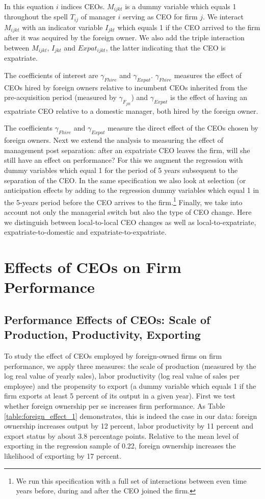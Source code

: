 \documentclass[12pt,a4paper]{article}
\begin{document}
In this equation $i$ indices CEOs. $M_{ijkt}$ is a dummy variable which equals 1 throughout the spell $T_{ij}$ of manager $i$ serving as CEO for firm $j$. We interact $M_{ijkt}$ with an indicator variable $I_{jkt}$ which equals 1 if the CEO arrived to the firm after it was acquired by the foreign owner. We also add the triple interaction between $M_{ijkt}$, $I_{jkt}$ and $Expat_{ijkt}$, the latter indicating that the CEO is expatriate. 

The coefficients of interest are $\gamma_{Fhire}$ and $\gamma_{Expat}$. $\gamma_{Fhire}$ measures the effect of CEOs hired by foreign owners relative to incumbent CEOs inherited from the pre-acquisition period (measured by $\gamma_{F_{jkt}}$) and $\gamma_{Expat}$ is the effect of having an expatriate CEO relative to a domestic manager, both hired by the foreign owner.

The coefficients $\gamma_{Fhire}$ and $\gamma_{Expat}$ measure the direct effect of the CEOs chosen by foreign owners. Next we extend the analysis to measuring the effect of management post separation: after an expatriate CEO leaves the firm, will she still have an effect on performance? For this we augment the regression with dummy variables which equal 1 for the period of 5 years subsequent to the separation of the CEO. In the same specification we also look at selection (or anticipation effects by adding to the regression dummy variables which equal 1 in the 5-years period before the CEO arrives to the firm.\footnote{We run this specification with a full set of interactions between even time years before, during and after the CEO joined the firm.} Finally, we take into account not only the managerial switch but also the type of CEO change. Here we distinguish between local-to-local CEO changes as well as local-to-expatriate, expatriate-to-domestic and expatriate-to-expatriate.

\section{Effects of CEOs on Firm Performance}

\subsection{Performance Effects of CEOs: Scale of Production, Productivity, Exporting}
To study the effect of CEOs employed by foreign-owned firms on firm performance, we apply three measures: the scale of production (measured by the log real value of yearly sales), labor productivity (log real value of sales per employee) and the propensity to export (a dummy variable which equals 1 if the firm exports at least 5 percent of its output in a given year). First we test whether foreign ownership per se increases firm performance. As Table \ref{table:foreign_effect_1} demonstrates, this is indeed the case in our data: foreign ownership increases output by 12 percent, labor productivity by 11 percent and export status by about 3.8 percentage points. Relative to the mean level of exporting in the regression sample of 0.22, foreign ownership increases the likelihood of exporting by 17 percent.
\end{document}
